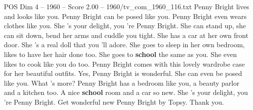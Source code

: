 \begin{textsample}{POS Dim 4 – 1960 – Score 2.00 – 1960/tv\_com\_1960\_116.txt}  \label{ex:f4_pos_010}
Penny Bright lives and looks like you.
Penny Bright can be posed like you.
Penny Bright even wears clothes like you.
She 's your delight, you 're Penny Bright.
She can stand up, she can sit down, bend her arms and cuddle you tight.
She has a car at her own front door.
She 's a real doll that you 'll adore.
She goes to sleep in her own bedroom, likes to have her hair done too.
She goes to \textbf{school} the same as you.
She even likes to cook like you do too.
Penny Bright comes with this lovely wardrobe case for her beautiful outfits.
Yes, Penny Bright is wonderful.
She can even be posed like you.
What 's more?
Penny Bright has a bedroom like you, a beauty parlor and a kitchen too.
A nice \textbf{school} room and a car so new.
She 's your delight, you 're Penny Bright.
Get wonderful new Penny Bright by Topsy.
Thank you.

\end{textsample}
